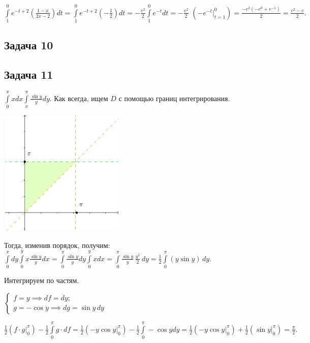 \documentclass[a4paper, fleqn]{article}
\begin{document}
    $\int\limits_{1}^{0} e^{-t + 2} \left( \frac{1 - x}{2x - 2}\right) dt = \int\limits_{1}^{0} e^{-t + 2} \left( - \frac{1}{2}\right) dt = -\frac{e^2}{2} \int\limits_{1}^{0} e^{-t} dt = -\frac{e^2}{2} \, \, \left(-e^{-t} \Bigg|_{t = 1}^{0} \right)=  \frac{-e^2(-e^0 + e^{-1})}{2} = \frac{e^2 - e}{2}.$
    
    \subsection*{Задача 10}
    
    \subsection*{Задача 11}
    
    $\int\limits_{0}^{\pi} x dx \int\limits_{x}^{\pi} \frac{\sin y}{y} dy.$ Как всегда, ищем $D$ с помощью границ интегрирования.
    
    
    \includegraphics[width=6cm, height=6cm]{task_11.png}
    
    Тогда, изменив порядок, получим: $\int\limits_{0}^{\pi} dy \int\limits_{0}^{y} x \frac{\sin y}{y} dx = \int\limits_{0}^{\pi} \frac{\sin y}{y} dy \int\limits_{0}^{y} x  dx = \int\limits_{0}^{\pi} \frac{\sin y}{y}  \, \frac{y^2}{2} \, dy = \frac{1}{2} \int\limits_{0}^{\pi} (y \sin y) \, dy.$
    
    Интегрируем по частям.
    
        
    $\begin{cases}
    f = y \implies df = dy;\\
    g = -\cos y \implies dg = \sin y\, dy
    \end{cases}$
    
    $\frac{1}{2} \left(f \cdot g \Bigg|_{0}^{\pi} \right) - \frac{1}{2} \int\limits_{0}^{\pi} g \cdot df  =
    \frac{1}{2} \left(-y \cos y \Bigg|_{0}^{\pi} \right) - \frac{1}{2} \int\limits_{0}^{\pi} - \cos y dy = 
    \frac{1}{2} \left(-y \cos y \Bigg|_{0}^{\pi} \right) + \frac{1}{2}  \left(\sin y \Bigg|_{0}^{\pi} \right) = \frac{\pi}{2}.$
    
\end{document}

